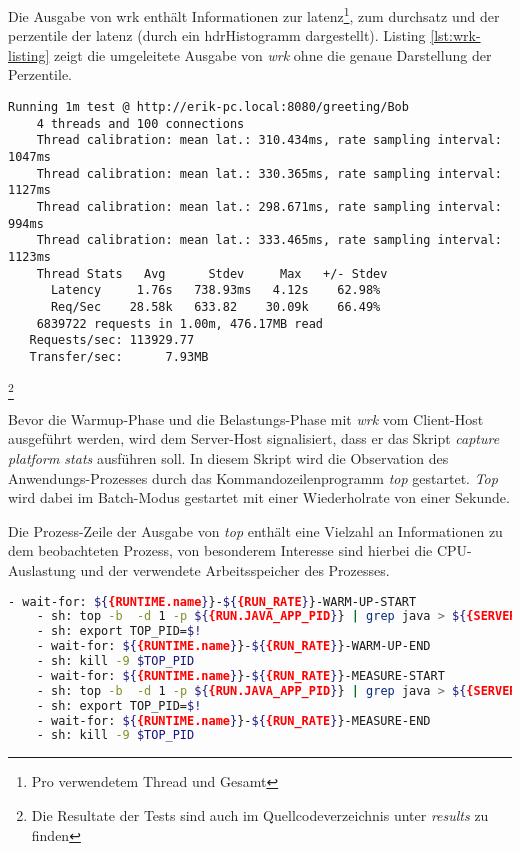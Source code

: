    Die Ausgabe von wrk enthält Informationen zur \Gls{latenz}\footnote{Pro verwendetem Thread und Gesamt},
   zum \Gls{durchsatz} und der \Gls{perzentile} der \Gls{latenz} (durch ein \Gls{hdrHistogramm} dargestellt).
   Listing \ref*{lst:wrk-listing} zeigt die umgeleitete Ausgabe von \textit{wrk} ohne die genaue Darstellung der Perzentile.
 
   \begin{lstlisting}[caption=Beispiel für Ausgabe von wrk,captionpos=b, label=lst:wrk-listing]
    Running 1m test @ http://erik-pc.local:8080/greeting/Bob
    4 threads and 100 connections
    Thread calibration: mean lat.: 310.434ms, rate sampling interval: 1047ms
    Thread calibration: mean lat.: 330.365ms, rate sampling interval: 1127ms
    Thread calibration: mean lat.: 298.671ms, rate sampling interval: 994ms
    Thread calibration: mean lat.: 333.465ms, rate sampling interval: 1123ms
    Thread Stats   Avg      Stdev     Max   +/- Stdev
      Latency     1.76s   738.93ms   4.12s    62.98%
      Req/Sec    28.58k   633.82    30.09k    66.49%
    6839722 requests in 1.00m, 476.17MB read
   Requests/sec: 113929.77
   Transfer/sec:      7.93MB
   \end{lstlisting}\footnote{Die Resultate der Tests sind auch im Quellcodeverzeichnis unter \textit{\/results} zu finden}

  Bevor die Warmup-Phase und die Belastungs-Phase mit \textit{wrk} vom Client-Host ausgeführt werden, wird dem Server-Host signalisiert, dass
  er das Skript \textit{capture platform stats} ausführen soll.
  In diesem Skript wird die Observation des Anwendungs-Prozesses durch das Kommandozeilenprogramm \textit{top} gestartet.
  \textit{Top} wird dabei im Batch-Modus gestartet mit einer Wiederholrate von einer Sekunde.

  Die Prozess-Zeile der Ausgabe von \textit{top} enthält eine Vielzahl an Informationen zu dem beobachteten Prozess, von besonderem
  Interesse sind hierbei die CPU-Auslastung und der verwendete Arbeitsspeicher des Prozesses.

  \begin{lstlisting}[language=sh, caption=Auszug des qDup Skripts capture-platform-stats, captionpos=b]
    - wait-for: ${{RUNTIME.name}}-${{RUN_RATE}}-WARM-UP-START
    - sh: top -b  -d 1 -p ${{RUN.JAVA_APP_PID}} | grep java > ${{SERVER_FILE_PATH}}/output/${{RUNTIME.name}}-${{RUN_RATE}}-WARM-UP-top.out &
    - sh: export TOP_PID=$!
    - wait-for: ${{RUNTIME.name}}-${{RUN_RATE}}-WARM-UP-END
    - sh: kill -9 $TOP_PID
    - wait-for: ${{RUNTIME.name}}-${{RUN_RATE}}-MEASURE-START
    - sh: top -b  -d 1 -p ${{RUN.JAVA_APP_PID}} | grep java > ${{SERVER_FILE_PATH}}/output/${{RUNTIME.name}}-${{RUN_RATE}}-MEASURE-top.out &
    - sh: export TOP_PID=$!
    - wait-for: ${{RUNTIME.name}}-${{RUN_RATE}}-MEASURE-END
    - sh: kill -9 $TOP_PID
  \end{lstlisting}

